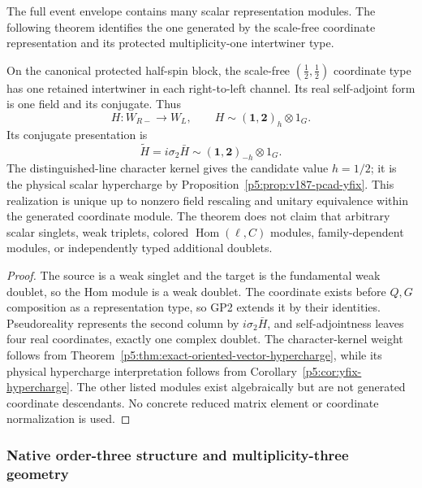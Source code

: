 \documentclass[12pt,a4paper]{article}
\begin{document}
The full event envelope contains many scalar representation modules.  The
following theorem identifies the one generated by the scale-free coordinate
representation and its protected multiplicity-one intertwiner type.

\begin{theorem}
\label{p5:thm:minimal-scalar-left-right-intertwiner}
On the canonical protected half-spin block, the scale-free
\((\tfrac12,\tfrac12)\) coordinate type has one retained intertwiner in each
right-to-left channel.  Its real self-adjoint form is one field and its
conjugate.  Thus
\begin{equation}
\label{p5:eq:part1-Higgs-slot}
H:W_{R-}\longrightarrow W_L,
\qquad
H\sim(\mathbf1,\mathbf2)_{h}\otimes1_G .
\end{equation}
Its conjugate presentation is
\begin{equation}
\label{p5:eq:part1-Higgs-conj}
\widetilde H=i\sigma_2\bar H
\sim(\mathbf1,\mathbf2)_{-h}\otimes1_G .
\end{equation}
The distinguished-line character kernel gives the candidate value \(h=1/2\);
it is the physical scalar hypercharge by Proposition~\ref{p5:prop:v187-pcad-yfix}.
This realization is unique up to nonzero field rescaling and unitary
equivalence within the generated coordinate module.  The theorem does not
claim that arbitrary scalar
singlets, weak triplets, colored \(\operatorname{Hom}(\ell,C)\) modules,
family-dependent modules, or independently typed additional doublets.
\end{theorem}

\begin{proof}
The source is a weak singlet and the target is the fundamental weak doublet,
so the Hom module is a weak doublet.  The coordinate exists before \(Q,G\)
composition as a representation type, so GP2 extends it by their identities.  Pseudoreality represents
the second column by \(i\sigma_2\bar H\), and self-adjointness leaves four
real coordinates, exactly one complex doublet.  The character-kernel weight
follows from Theorem~\ref{p5:thm:exact-oriented-vector-hypercharge}, while its
physical hypercharge interpretation follows from
Corollary~\ref{p5:cor:yfix-hypercharge}.  The other listed
modules exist algebraically but are not generated coordinate descendants.
No concrete reduced matrix element or coordinate normalization is used.
\end{proof}

\subsubsection{Native order-three structure and multiplicity-three geometry}
\label{p5:sec:part1-native-z3}
\end{document}
